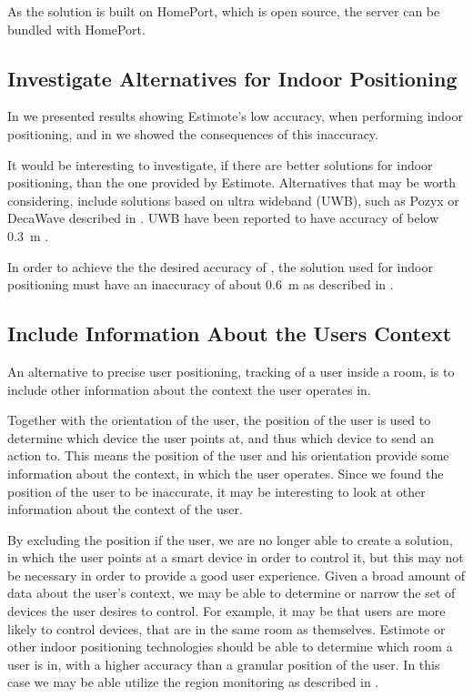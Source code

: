As the solution is built on HomePort, which is open source, 
the server can be bundled with HomePort.

\subsection{Investigate Alternatives for Indoor Positioning}

In  we presented results showing Estimote's low accuracy, 
when performing indoor positioning, 
and in  we showed the consequences of this inaccuracy.

It would be interesting to investigate, 
if there are better solutions for indoor positioning, 
than the one provided by Estimote.
Alternatives that may be worth considering, 
include solutions based on ultra wideband (UWB), 
such as Pozyx or DecaWave described in .
UWB have been reported to have accuracy of below \SI{0.3}{\meter} \cite{Liu:4343996}.

In order to achieve the the desired accuracy of ,
the solution used for indoor positioning must have an inaccuracy of about \SI{0.6}{\meter}
as described in .

\subsection{Include Information About the Users Context}

An alternative to precise user positioning, 
\ie tracking of a user inside a room, 
is to include other information about the context the user operates in.

Together with the orientation of the user, 
the position of the user is used to determine which device the user points at, 
and thus which device to send an action to. 
This means the position of the user and his orientation provide some information about the context, 
in which the user operates. 
Since we found the position of the user to be inaccurate, 
it may be interesting to look at other information about the context of the user.

By excluding the position if the user, 
we are no longer able to create a solution, 
in which the user points at a smart device in order to control it, 
but this may not be necessary in order to provide a good user experience. 
Given a broad amount of data about the user's context, 
we may be able to determine or narrow the set of devices the user desires to control. 
For example, it may be that users are more likely to control devices, 
that are in the same room as themselves. 
Estimote or other indoor positioning technologies should be able to determine which room a user is in, 
with a higher accuracy than a granular position of the user. In this case we may be able utilize the region monitoring as described in .

